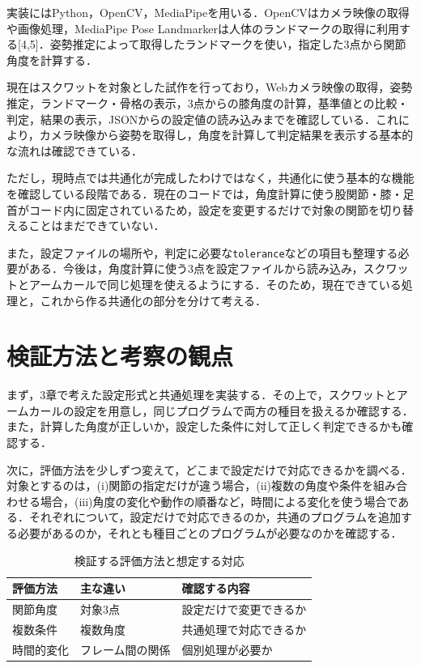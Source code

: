 \documentclass[no-page-number]{nanzan-abstract}
\begin{document}
実装にはPython，OpenCV，MediaPipeを用いる．OpenCVはカメラ映像の取得や画像処理，MediaPipe Pose Landmarkerは人体のランドマークの取得に利用する[4,5]．姿勢推定によって取得したランドマークを使い，指定した3点から関節角度を計算する．

現在はスクワットを対象とした試作を行っており，Webカメラ映像の取得，姿勢推定，ランドマーク・骨格の表示，3点からの膝角度の計算，基準値との比較・判定，結果の表示，JSONからの設定値の読み込みまでを確認している．これにより，カメラ映像から姿勢を取得し，角度を計算して判定結果を表示する基本的な流れは確認できている．

ただし，現時点では共通化が完成したわけではなく，共通化に使う基本的な機能を確認している段階である．現在のコードでは，角度計算に使う股関節・膝・足首がコード内に固定されているため，設定を変更するだけで対象の関節を切り替えることはまだできていない．

また，設定ファイルの場所や，判定に必要な\texttt{tolerance}などの項目も整理する必要がある．今後は，角度計算に使う3点を設定ファイルから読み込み，スクワットとアームカールで同じ処理を使えるようにする．そのため，現在できている処理と，これから作る共通化の部分を分けて考える．


\section{検証方法と考察の観点}

まず，3章で考えた設定形式と共通処理を実装する．その上で，スクワットとアームカールの設定を用意し，同じプログラムで両方の種目を扱えるか確認する．また，計算した角度が正しいか，設定した条件に対して正しく判定できるかも確認する．

次に，評価方法を少しずつ変えて，どこまで設定だけで対応できるかを調べる．対象とするのは，(i)関節の指定だけが違う場合，(ii)複数の角度や条件を組み合わせる場合，(iii)角度の変化や動作の順番など，時間による変化を使う場合である．それぞれについて，設定だけで対応できるのか，共通のプログラムを追加する必要があるのか，それとも種目ごとのプログラムが必要なのかを確認する．

\begin{table}[t]
\centering
\caption{検証する評価方法と想定する対応}
\small
\begin{tabular}{p{}p{}p{}}
\toprule
評価方法 & 主な違い & 確認する内容\\
\midrule
関節角度 & 対象3点 & 設定だけで変更できるか\\
複数条件 & 複数角度 & 共通処理で対応できるか\\
時間的変化 & フレーム間の関係 & 個別処理が必要か\\
\bottomrule
\end{tabular}
\end{table}
\end{document}
